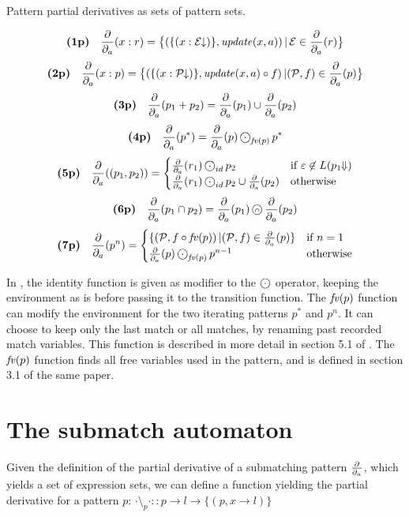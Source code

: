 \begin{defn}
   \label{defn-pd-pset}
   Pattern partial derivatives as sets of pattern sets.

   \[\textbf{(1p)}\quad \frac{\partial}{\partial_{a}}(x:r)
      = \big\{ (\{ (x:\mathcal{E}\!\!\downarrow) \}, \mathit{update}(x, a)) \operatorname{|} \mathcal{E} \in \frac{\partial}{\partial_{a}}(r) \big\}\]
   \[\textbf{(2p)}\quad \frac{\partial}{\partial_{a}}(x:p)
      = \big\{ (\{ (x:\mathcal{P}\!\!\downarrow) \}, \mathit{update}(x, a) \circ f) \operatorname{|} (\mathcal{P}, f) \in \frac{\partial}{\partial_{a}}(p) \big\}\]
   \[\textbf{(3p)}\quad \frac{\partial}{\partial_{a}}(p_1 + p_2) = \frac{\partial}{\partial_{a}}(p_1) \cup \frac{\partial}{\partial_{a}}(p_2)\]
   \[\nrdef{4p} \dda(p^*) = \dda(p) \circledcdot_{\iteratefvp} p^*\]
   \needspace{3cm}
   \[\nrdef{5p} \dda((p_1, p_2)) =
       \begin{cases}
          \dda(r_1) \circledcdot_{id} p_2 & \text{if } \varepsilon \not\in L(p_1\reOfPsets) \\
          \dda(r_1) \circledcdot_{id} p_2 \cup \dda(p_2) & \text{otherwise}
       \end{cases}
   \]
   \[\textbf{(6p)}\quad \frac{\partial}{\partial_{a}}(p_1 \cap p_2) = \frac{\partial}{\partial_{a}}(p_1) \operatorname{\text{\textcircled{\tiny$\cap$}}} \frac{\partial}{\partial_{a}}(p_2)\]
   \[\nrdef{7p} \dda(p^n) =
       \begin{cases}
          \{ (\pset, f \circ \iteratefvp) \where (\pset, f) \in \dda(p) \} & \text{if } n = 1 \\
          \dda(p) \circledcdot_{\iteratefvp} p^{n-1} & \text{otherwise}
       \end{cases}
   \]
\end{defn}

In , the identity function is given as modifier to the $\circledcdot$
operator, keeping the environment as is before passing it to the transition
function. The $\iteratefvp$ function can modify the environment for the two
iterating patterns $p^*$ and $p^n$. It can choose to keep only the last match or
all matches, by renaming past recorded match variables. This function is
described in more detail in section 5.1 of \cite{pdpat}. The $\mathit{fv}(p)$ function
finds all free variables used in the pattern, and is defined in section 3.1 of
the same paper.


\section{The submatch automaton}
\label{nfa}

Given the definition of the partial derivative of a submatching pattern $\frac{\partial}{\partial_{a}}$,
which yields a set of expression sets, we can define a function yielding the
partial derivative for a pattern $p$: $\cdot \setminus_p \cdot :: p \to l \to
\{(p, x \to l)\}$

